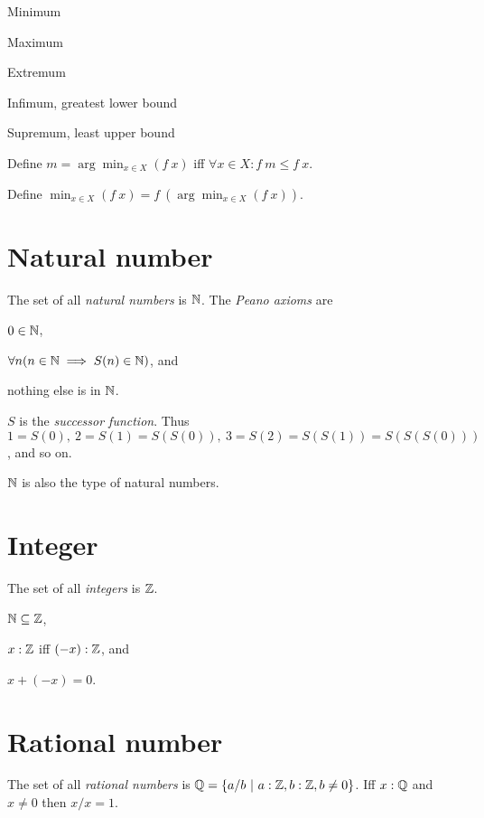 Minimum

Maximum

Extremum

Infimum, greatest lower bound

Supremum, least upper bound

%
Define \(m = \arg\min_{x \in X}(f~x)\) iff \(\forall x \in X : f~m \le f~x\).

%
Define \(\min_{x \in X}(f~x) = f~(\arg\min_{x \in X}(f~x))\).

\section{Natural number}

%
The set of all \emph{natural numbers} is \(\mathbb{N}\).
%
The \emph{Peano axioms} are
\begin{enumerate*}[label={(\arabic*)}]
    \item \(0 \in \mathbb{N}\),
    \item \(\forall n (n \in \mathbb{N} \implies S(n) \in \mathbb{N})\), and
    \item nothing else is in \(\mathbb{N}\).
\end{enumerate*}
%
\(S\) is the \emph{successor function}.
Thus \(1 = S(0), ~ 2 = S(1) = S(S(0)), ~ 3 = S(2) = S(S(1)) = S(S(S(0)))\), and so on.

\(\mathbb{N}\) is also the type of natural numbers.

\section{Integer}

%
%
The set of all \emph{integers} is \(\mathbb{Z}\).
\begin{enumerate*}[label={(\arabic*)}]
    \item \(\mathbb{N} \subseteq \mathbb{Z}\),
    \item \(x : \mathbb{Z}\) iff \((-x) : \mathbb{Z}\), and
    \item \(x + (-x) = 0\).
\end{enumerate*}

\section{Rational number}

%
%
The set of all \emph{rational numbers} is
\(\mathbb{Q} = \{ a/b ~|~ a : \mathbb{Z}, b : \mathbb{Z}, b \neq 0 \}\).
Iff \(x : \mathbb{Q}\) and \(x \neq 0\) then \(x/x = 1\).

